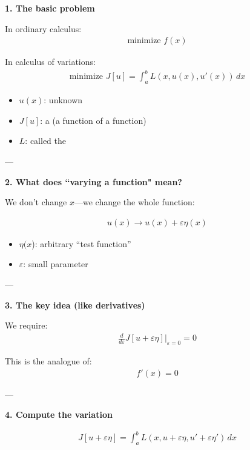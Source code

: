 \documentclass[12pt,a4paper]{report}
\begin{document}
\begin{description}
\item \textbf{1. The basic problem}

In ordinary calculus:
\begin{align*}
\text{minimize } f(x)
\end{align*}

In calculus of variations:
\begin{align*}
\boxed{
\text{minimize } J[u] = \int_a^b L(x, u(x), u'(x))\,dx
}
\end{align*}

\begin{itemize}
\item $u(x)$: unknown 
\item $J[u]$: a  (a function of a function)
\item $L$: called the 
\end{itemize}

---

\item \textbf{2. What does ``varying a function" mean?}

We don’t change $x$—we change the whole function:

\begin{align*}
u(x) \to u(x) + \varepsilon \eta(x)
\end{align*}

\begin{itemize}
\item $\eta(x$): arbitrary “test function”
\item $\varepsilon$: small parameter
\end{itemize}

---

\item \textbf{3. The key idea (like derivatives)}

We require:
\begin{align*}
\boxed{
\frac{d}{d\varepsilon} J[u + \varepsilon \eta]\Big|_{\varepsilon=0} = 0
}
\end{align*}

This is the analogue of:
\begin{align*}
f'(x)=0
\end{align*}

---

\item \textbf{4. Compute the variation}

\begin{align*}
J[u+\varepsilon \eta] = \int_a^b L(x, u+\varepsilon\eta, u'+\varepsilon\eta')\,dx
\end{align*}


\end{description}
\end{document}
